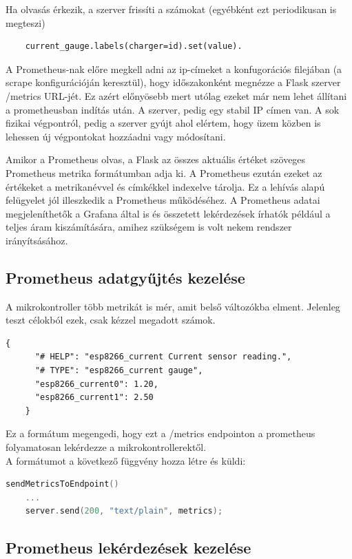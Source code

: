 Ha olvasás érkezik, a szerver frissíti a számokat (egyébként ezt periodikusan is megteszi)
\begin{lstlisting}
    current_gauge.labels(charger=id).set(value). 
\end{lstlisting}

A Prometheus-nak előre megkell adni az ip-címeket a konfugorációs filejában
(a scrape konfigurációján keresztül), hogy időszakonként megnézze a Flask szerver 
/metrics URL-jét. 
Ez azért előnyösebb mert utólag ezeket már nem lehet állítani a prometheusban indítás után.
A szerver, pedig egy stabil IP címen van. A sok fizikai végpontról, pedig a szerver gyújt ahol elértem, hogy 
üzem közben is lehessen új végpontokat hozzáadni vagy módosítani.

Amikor a Prometheus olvas, a Flask az összes aktuális értéket szöveges 
Prometheus metrika formátumban adja ki. A Prometheus ezután ezeket az értékeket a metrikanévvel és címkékkel 
indexelve tárolja. Ez a lehívás alapú felügyelet jól illeszkedik a Prometheus működéséhez. 
A Prometheus adatai megjeleníthetők a Grafana által is és összetett lekérdezések írhatók 
például a teljes áram kiszámítására, amihez szükségem is volt nekem rendszer irányítsásához.

\subsection{Prometheus adatgyűjtés kezelése}

A mikrokontroller több metrikát is mér, 
amit belső változókba elment. Jelenleg teszt célokból ezek, csak kézzel megadott számok.

\begin{lstlisting}[language=HTML]
    {
      "# HELP": "esp8266_current Current sensor reading.",
      "# TYPE": "esp8266_current gauge",
      "esp8266_current0": 1.20,
      "esp8266_current1": 2.50
    }
\end{lstlisting}

Ez a formátum megengedi, hogy ezt a /metrics endpointon a prometheus folyamatosan lekérdezze a mikrokontrollerektől. \\

A formátumot a következő függvény hozza létre és küldi:

\begin{lstlisting}[language=C]
    sendMetricsToEndpoint()
    ...
    server.send(200, "text/plain", metrics);
\end{lstlisting}

\subsection{Prometheus lekérdezések kezelése}

